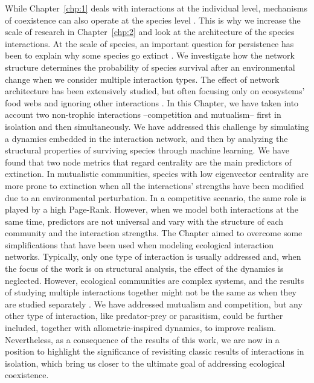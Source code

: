 While Chapter~\ref{chp:1} deals with interactions at the individual level, mechanisms of coexistence can also operate at the species level \cite{Grilli2017,Garcia-Callejas2018ThePersistence}. This is why we increase the scale of research in Chapter~\ref{chp:2} and look at the architecture of the species interactions. At the scale of species, an important question for persistence has been to explain why some species go extinct \cite{Sole2001, Keyes2021AnLosses}. We investigate how the network structure determines the probability of species survival after an environmental change when we consider multiple interaction types. The effect of network architecture has been extensively studied, but often focusing only on ecosystems' food webs and ignoring other interactions \cite{pascual2006ecological,kefi2020theoretical}. In this Chapter, we have taken into account two non-trophic interactions --competition and mutualism-- first in isolation and then simultaneously. We have addressed this challenge by simulating a dynamics embedded in the interaction network, and then by analyzing the structural properties of surviving species through machine learning. We have found that two node metrics that regard centrality are the main predictors of extinction. In mutualistic communities, species with low eigenvector centrality are more prone to extinction when all the interactions' strengths have been modified due to an environmental perturbation. In a competitive scenario, the same role is played by a high Page-Rank. However, when we model both interactions at the same time, predictors are not universal and vary with the structure of each community and the interaction strengths. The Chapter aimed to overcome some simplifications that have been used when modeling ecological interaction networks. Typically, only one type of interaction is usually addressed and, when the focus of the work is on structural analysis, the effect of the dynamics is neglected.  However, ecological communities are complex systems, and the results of studying multiple interactions together might not be the same as when they are studied separately \cite{kefi2012more,Kefi2015NetworkShores}. We have addressed mutualism and competition, but any other type of interaction, like predator-prey or parasitism, could be further included, together with  allometric-inspired dynamics, to improve realism. Nevertheless, as a consequence of the results of this work, we are now in a position to highlight the significance of revisiting classic results of interactions in isolation, which bring us closer to the ultimate goal of addressing ecological coexistence. \\

